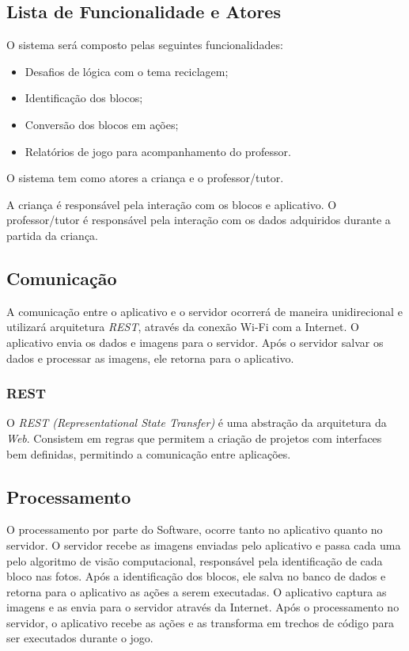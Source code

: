     \subsection{Lista de Funcionalidade e Atores}
    O sistema será composto  pelas seguintes funcionalidades:
    \begin{itemize}
        \item Desafios de lógica com o tema reciclagem;
        \item Identificação dos blocos;
        \item Conversão dos blocos em ações;
        \item Relatórios de jogo para acompanhamento do professor.
    \end{itemize}
    
    O sistema tem como atores a criança e o professor/tutor.
    
    A criança é responsável pela interação com os blocos e aplicativo.
    O professor/tutor é responsável pela interação com os dados adquiridos durante a partida da criança.
    
    \subsection{Comunicação}
    A comunicação entre o aplicativo e o servidor ocorrerá de maneira unidirecional e utilizará arquitetura \textit{REST}, através da conexão Wi-Fi com a Internet.
    O aplicativo envia os dados e imagens para o servidor. Após o servidor salvar os dados e processar as imagens, ele retorna para o aplicativo.
    
        \subsubsection{REST}
        O \textit{REST (Representational State Transfer)} é uma abstração da arquitetura da \textit{Web}. Consistem em regras que permitem a criação de projetos com interfaces bem definidas, permitindo a comunicação entre aplicações.
    
    
    \subsection{Processamento}
    O processamento por parte do Software, ocorre tanto no aplicativo quanto no servidor.
    O servidor recebe as imagens enviadas pelo aplicativo e passa cada uma pelo algoritmo de visão computacional, responsável pela identificação de cada bloco nas fotos. Após a identificação dos blocos, ele salva no banco de dados e retorna para o aplicativo as ações a serem executadas.
    O aplicativo captura as imagens e as envia para o servidor através da Internet. Após o processamento no servidor, o aplicativo recebe as ações e as transforma em trechos de código para ser executados durante o jogo.
    
